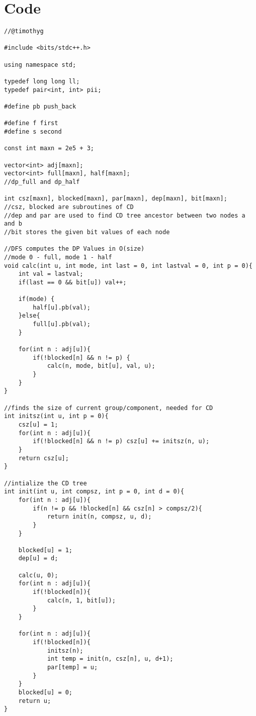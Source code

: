 \documentclass[15pt]{article}
\begin{document}
\section{Code}
\begin{lstlisting}
//@timothyg
 
#include <bits/stdc++.h>
 
using namespace std;
 
typedef long long ll;
typedef pair<int, int> pii;
 
#define pb push_back
 
#define f first
#define s second
 
const int maxn = 2e5 + 3;

vector<int> adj[maxn];
vector<int> full[maxn], half[maxn];
//dp_full and dp_half

int csz[maxn], blocked[maxn], par[maxn], dep[maxn], bit[maxn];
//csz, blocked are subroutines of CD
//dep and par are used to find CD tree ancestor between two nodes a and b
//bit stores the given bit values of each node
 
//DFS computes the DP Values in O(size)
//mode 0 - full, mode 1 - half
void calc(int u, int mode, int last = 0, int lastval = 0, int p = 0){
    int val = lastval;
    if(last == 0 && bit[u]) val++;
 
    if(mode) {
        half[u].pb(val);
    }else{
        full[u].pb(val);
    }    
 
    for(int n : adj[u]){
        if(!blocked[n] && n != p) {
            calc(n, mode, bit[u], val, u);
        }
    }
}
 
//finds the size of current group/component, needed for CD
int initsz(int u, int p = 0){ 
    csz[u] = 1;
    for(int n : adj[u]){
        if(!blocked[n] && n != p) csz[u] += initsz(n, u);
    }
    return csz[u];
}
 
//intialize the CD tree
int init(int u, int compsz, int p = 0, int d = 0){
    for(int n : adj[u]){
        if(n != p && !blocked[n] && csz[n] > compsz/2){
            return init(n, compsz, u, d);
        }
    }
 
    blocked[u] = 1;
    dep[u] = d;
 
    calc(u, 0);
    for(int n : adj[u]){
        if(!blocked[n]){
            calc(n, 1, bit[u]);
        }
    }
 
    for(int n : adj[u]){
        if(!blocked[n]){
            initsz(n); 
            int temp = init(n, csz[n], u, d+1);
            par[temp] = u;
        }
    }
    blocked[u] = 0;
    return u;
}
 

\end{lstlisting}
\end{document}
